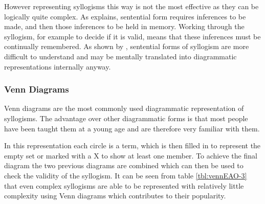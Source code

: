 \documentclass[12pt,a4paper]{report}
\begin{document}
However representing syllogisms this way is not the most effective as they can be logically quite complex. As \citep{larkin1987diagram} explains, sentential form requires inferences to be made, and then those inferences to be held in memory. Working through the syllogism, for example to decide if it is valid, means that these inferences must be continually remembered. As shown by \cite{johnson1980mental}, sentential forms of syllogism are more difficult to understand and may be mentally translated into diagrammatic representations internally anyway. 

\subsubsection{Venn Diagrams}
Venn diagrams are the most commonly used diagrammatic representation of syllogisms. The advantage over other diagrammatic forms is that most people have been taught them at a young age and are therefore very familiar with them. 

In this representation each circle is a term, which is then filled in to represent the empty set or marked with a X to show at least one member. To achieve the final diagram the two previous diagrams are combined which can then  be used to check the validity of the syllogism. It can be seen from table \ref{tbl:vennEAO-3} that even complex syllogisms are able to be represented with relatively little complexity using Venn diagrams which contributes to their popularity. 
\end{document}
